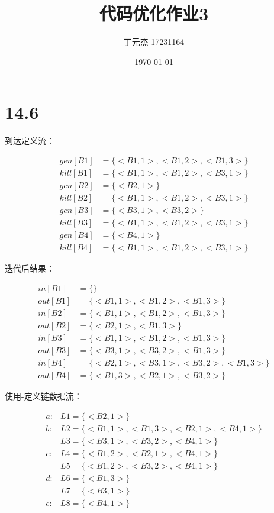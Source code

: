 \documentclass[UTF8]{ctexart}
\title{代码优化作业3}
\author{丁元杰 17231164}
\date{\today}
\begin{document}
\maketitle


\section*{14.6}

到达定义流：

\begin{align*}
    gen[B1] &= \{<B1, 1>, <B1, 2>, <B1, 3>\} \\
    kill[B1] &= \{<B1, 1>, <B1, 2>, <B3, 1>\} \\
    gen[B2] &= \{<B2, 1>\} \\
    kill[B2] &= \{<B1, 1>, <B1, 2>, <B3, 1>\} \\
    gen[B3] &= \{<B3, 1>, <B3, 2>\} \\
    kill[B3] &= \{<B1, 1>, <B1, 2>, <B3, 1>\} \\
    gen[B4] &= \{<B4, 1>\} \\
    kill[B4] &= \{<B1, 1>, <B1, 2>, <B3, 1>\}
\end{align*}

迭代后结果：

\begin{align*}
    in[B1] &= \{\} \\
    out[B1] &= \{<B1, 1>, <B1, 2>, <B1, 3>\} \\
    in[B2] &= \{<B1, 1>, <B1, 2>, <B1, 3>\} \\
    out[B2] &= \{<B2, 1>, <B1, 3>\} \\
    in[B3] &= \{<B1, 1>, <B1, 2>, <B1, 3>\} \\
    out[B3] &= \{<B3, 1>, <B3, 2>, <B1, 3>\} \\
    in[B4] &= \{<B2, 1>, <B3, 1>, <B3, 2>, <B1, 3>\} \\
    out[B4] &= \{<B1, 3>, <B2, 1>, <B3, 2>\}
\end{align*}

使用-定义链数据流：

\begin{align*}
    a: &L1 = \{<B2, 1>\} \\
    b: &L2 = \{<B1, 1>, <B1, 3>, <B2, 1>, <B4, 1>\} \\
       &L3 = \{<B3, 1>, <B3, 2>, <B4, 1>\} \\
    c: &L4 = \{<B1, 2>, <B2, 1>, <B4, 1>\} \\
       &L5 = \{<B1, 2>, <B3, 2>, <B4, 1>\} \\
    d: &L6 = \{<B1, 3>\} \\
       &L7 = \{<B3, 1>\} \\
    e: &L8 = \{<B4, 1>\} \\
\end{align*}
\end{document}
